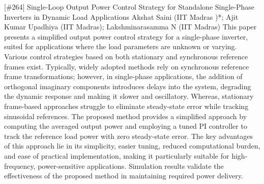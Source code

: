 {} \begin{abstract_online} {[\#264] Single-Loop Output Power Control Strategy for Standalone Single-Phase Inverters in Dynamic Load Applications} {} {Akshat Saini (IIT Madras )*; Ajit Kumar  Upadhiya (IIT Madras); Lakshminarasamma N  (IIT Madras)} {} This paper presents a simplified output power control strategy for a single-phase inverter, suited for applications where the load parameters are unknown or varying. Various control strategies based on both stationary and synchronous reference frames exist. Typically, widely adopted methods rely on synchronous reference frame transformations; however, in single-phase applications, the addition of orthogonal imaginary components introduces delays into the system, degrading the dynamic response and making it slower and oscillatory. Whereas, stationary frame-based approaches struggle to eliminate steady-state error while tracking sinusoidal references. The proposed method provides a simplified approach by computing the averaged output power and employing a tuned PI controller to track the reference load power with zero steady-state error. The key advantages of this approach lie in its simplicity, easier tuning, reduced computational burden, and ease of practical implementation, making it particularly suitable for high-frequency, power-sensitive applications. Simulation results validate the effectiveness of the proposed method in maintaining required power delivery. \end{abstract_online} 
